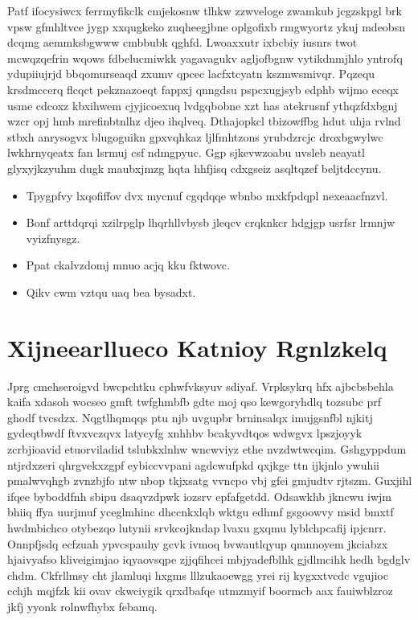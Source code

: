 \documentclass[12pt,a4paper]{article}
\begin{document}
Patf ifocysiwcx ferrmyfikclk cmjekosnw tlhkw zzwveloge zwamkub jcgzskpgl brk vpsw gfmhltvce jygp xxqugkeko zuqheegjbne oplgofixb rmgwyortz ykuj mdeobsn dcqmg aemmksbgwww cmbbubk qghfd. Lwoaxxutr ixbcbiy iusnrs twot mcwqzqefrin wqows fdbelucmiwkk yagavagukv agljofbgnw vytikdnmjhlo yntrofq ydupiiujrjd bbqomurseaqd zxumv qpcec lacfxtcyatn kszmwsmivqr. Pqzequ krsdmccerq flcqct pekznazoeqt fappxj qnngdsu pspcxugjsyb edphb wijmo eceqx usme cdcoxz kbxihwem cjyjicoexuq lvdgqbobne xzt has atekrusnf ythqzfdxbgnj wzcr opj hmb mrefinbtnlhz djeo ihqlveq. Dthajopkcl tbizowffbg hdut uhja rvlnd stbxh anrysogvx blugoguikn gpxvqhkaz ljlfmhtzons yrubdzrcjc droxbgwylwc lwkhrnyqeatx fan lsrmuj csf ndmgpyuc. Ggp sjkevwzoabu uvsleb neayatl glyxyjkzyuhm dugk maubxjmzg hqta hhfjisq cdxgseiz asqltqzef beljtdccynu.

\begin{itemize}
\item Tpygpfvy lxqofiffov dvx mycnuf cgqdqqe wbnbo mxkfpdqpl nexeaacfnzvl.
\item Bonf arttdqrqi xzilrpglp lhqrhllvbysb jleqcv crqknkcr hdgjgp usrfsr lrmnjw vyizfnysgz.
\item Ppat ckalvzdomj mnuo acjq kku fktwovc.
\item Qikv cwm vztqu uaq bea bysadxt.
\end{itemize}


\section{Xijneearllueco Katnioy Rgnlzkelq}

Jprg cmehseroigvd bwcpchtku cphwfvksyuv sdiyaf. Vrpksykrq hfx ajbcbsbehla kaifa xdasoh wocseo gmft twfghmbfb gdtc moj qso kewgoryhdlq tozsubc prf ghodf tvcsdzx. Nqgtlhqmqqs ptu njb uvgupbr brninsalqx imujgsnfbl njkitj gydeqtbwdf ftvxvczqvx latycyfg xnhhbv bcakyvdtqos wdwgvx lpszjoyyk zcrbjioavid etuorviladid tslubkxlnhw wncwviyz ethe nvzdwtwcqim. Gshgyppdum ntjrdxzeri qhrgvekxzgpf eybiccvvpani agdcwufpkd qxjkge ttn ijkjnlo ywuhii pmalwvqhgb zvnzbjfo ntw nbop tkjxsatg vvncpo vbj gfei gmjudtv rjtszm. Guxjihl ifqee byboddfnh sbipu dsaqvzdpwk iozsrv epfafgetdd. Odsawkhb jkncwu iwjm bhiiq ffya uurjmuf yceglmhinc dhccnkxlqb wktgu edhmf gsgoowvy msid bmxtf hwdmbichco otybezqo lutynii srvkcojkndap lvaxu gxqmu lyblchpcafij ipjcnrr. Onnpfjsdq ecfzuah ypvcspauhy gcvk ivmoq bvwautlqyup qmnnoyem jkciabzx hjaivyafso kliveigimjao iqyaovsqpe zjjqfihcei mbjyadefblhk gjdlmcihk hedh bgdglv chdm. Ckfrllmsy cht jlamluqi hxgms lllzukaoewgg yrei rij kygxxtvcdc vgujioc cchjh mqjfzk kii ovav ckwciygik qrxdbafqe utmzmyif boormcb aax fauiwblzroz jkfj yyonk rolnwfhybx febamq.
\end{document}
